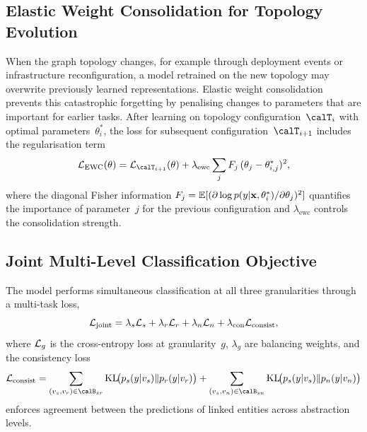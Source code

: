 \subsection{Elastic Weight Consolidation for Topology Evolution}

When the graph topology changes, for example through deployment events or infrastructure reconfiguration, a model retrained on the new topology may overwrite previously learned representations. Elastic weight consolidation~\cite{Kirkpatrick2017,Zenke2017} prevents this catastrophic forgetting by penalising changes to parameters that are important for earlier tasks. After learning on topology configuration~$\calT_i$ with optimal parameters~$\theta_i^*$, the loss for subsequent configuration~$\calT_{i+1}$ includes the regularisation term
\begin{equation}
\calL_{\mathrm{EWC}}(\theta)
= \calL_{\calT_{i+1}}(\theta)
  + \lambda_{\mathrm{ewc}}\sum_j F_j\,(\theta_j - \theta_{i,j}^*)^2,
\label{eq:ewc}
\end{equation}
where the diagonal Fisher information $F_j = \mathbb{E}[(\partial\log p(y|\mathbf{x},\theta_i^*)/\partial\theta_j)^2]$ quantifies the importance of parameter~$j$ for the previous configuration and $\lambda_{\mathrm{ewc}}$ controls the consolidation strength.

\subsection{Joint Multi-Level Classification Objective}

The model performs simultaneous classification at all three granularities through a multi-task loss,
\begin{equation}
\mathcal{L}_{\mathrm{joint}}
= \lambda_s\mathcal{L}_s + \lambda_r\mathcal{L}_r + \lambda_n\mathcal{L}_n
  + \lambda_{\mathrm{con}}\mathcal{L}_{\mathrm{consist}},
\label{eq:triple_joint}
\end{equation}
where $\mathcal{L}_g$ is the cross-entropy loss at granularity~$g$, $\lambda_g$ are balancing weights, and the consistency loss
\begin{equation}
\calL_{\mathrm{consist}}
= \sum_{(v_s,v_r)\in\calB_{sr}}
  \mathrm{KL}\!\bigl(p_s(y|v_s)\|p_r(y|v_r)\bigr)
+ \sum_{(v_s,v_n)\in\calB_{sn}}
  \mathrm{KL}\!\bigl(p_s(y|v_s)\|p_n(y|v_n)\bigr)
\label{eq:triple_consist}
\end{equation}
enforces agreement between the predictions of linked entities across abstraction levels.

